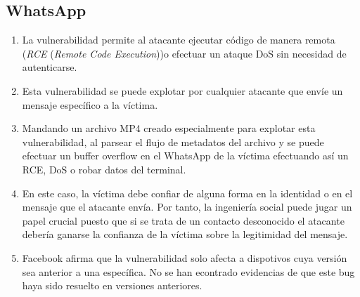 \documentclass[10pt,a4paper]{article}
\begin{document}
\subsection{WhatsApp}
\begin{enumerate}
\item La vulnerabilidad permite al atacante ejecutar código de manera remota (\textit{RCE} (\textit{Remote Code Execution}))o efectuar un ataque DoS sin necesidad de autenticarse.
\item Esta vulnerabilidad se puede explotar por cualquier atacante que envíe un mensaje específico a la víctima.
\item Mandando un archivo MP4 creado especialmente para explotar esta vulnerabilidad, al parsear el flujo de metadatos del archivo y se puede efectuar un buffer overflow en el WhatsApp de la víctima efectuando así un RCE, DoS o robar datos del terminal.
\item En este caso, la víctima debe confiar de alguna forma en la identidad o en el mensaje que el atacante envía. Por tanto, la ingeniería social puede jugar un papel crucial puesto que si se trata de un contacto desconocido el atacante debería ganarse la confianza de la víctima sobre la legitimidad del mensaje.
\item Facebook afirma que la vulnerabilidad solo afecta a dispotivos cuya versión sea anterior a una específica. No se han econtrado evidencias de que este bug haya sido resuelto en versiones anteriores.
\end{enumerate}

\section{}
\end{document}
